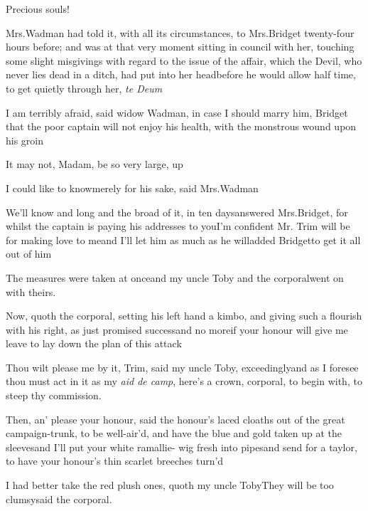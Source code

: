 \documentclass{article}
\begin{document}
Precious souls!\tsh

Mrs.\@ Wadman had told it, with all its circumstances, to
Mrs.\@ Bridget twenty-four hours before; and was at that very\break
moment sitting in council with her, touching some slight misgivings
with regard to the issue of the affair, which the Devil, who never
lies dead in a ditch, had put into her head\tsk before he would
allow half time, to get quietly through her, \textit{te Deum}\tsh

I am terribly afraid, said widow Wadman, in case I should
marry him, Bridget\pb 
\tsk that the poor captain will not enjoy his
health, with the monstrous wound upon his groin\tsh

It may not, Madam, be so very large, 
up\tsh

\tsh I could like to know\tsk merely for his sake,
said Mrs.\@ Wadman\tsh

\tsk We’ll know and long and the broad of it, in ten
days\tsk answered Mrs.\@ Bridget, for whilst the captain is
paying his addresses to you\tsk I’m confident Mr.
Trim will be for making love to me\tsk and I’ll let
him as much as he will\tsk added\break
Bridget\tsk to get it
all out of him\tsh

The measures were taken at once\tsh\break and my uncle
Toby and the corporal\break went on with theirs.

\newpage
Now, quoth the corporal, setting his left hand a kimbo, and
giving such a flourish with his right, as just promised
success\tsk and no more\tsh if your honour will give me
leave to lay down the plan of this attack\tsh

\tsh Thou wilt please me by it, Trim, said my
uncle Toby, exceedingly\tsk and as I foresee thou must act
in it as my \textit{aid de camp}, here’s a crown, corporal, to
begin with, to steep thy commission.

Then, an’ please your honour, said the\break
{}\break
{}\break
honour’s laced cloaths out of the great campaign-trunk, to be
well-air’d, and have the blue and gold taken up at the
sleeves\tsk and I’ll put your white ramallie-\pb 
wig fresh into
pipes\tsk and send for a taylor, to have your honour’s thin
scarlet breeches turn’d\tsh

\tsh I had better take the red plush ones,\break
quoth my uncle Toby\tsk They will be\break
too clumsy\tsk said the corporal.
\end{document}
